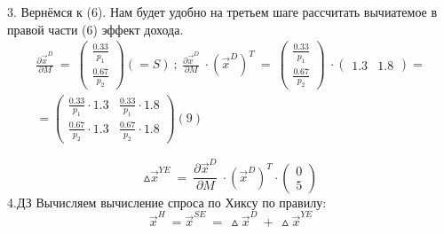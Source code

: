 \documentclass[12pt,a4paper]{article}
\begin{document}
	3. Вернёмся к (6). Нам будет удобно на третьем шаге рассчитать вычиатемое в правой части (6) эффект дохода.
\begin{gather*}
\frac{\partial \vec{x}^{D}}{\partial M} \ =\ \begin{pmatrix}
\frac{0.33}{p_{1}}\\
\frac{0.67}{p_{2}}
\end{pmatrix}( =S) \ ;\ \frac{\partial \vec{x}^{D}}{\partial M} \ \cdot (\vec{x}^{D})^{T} \ =\ \begin{pmatrix}
\frac{0.33}{p_{1}}\\
\frac{0.67}{p_{2}}
\end{pmatrix} \ \cdot \begin{pmatrix}
1.3 & 1.8
\end{pmatrix} =\\
=\begin{pmatrix}
\frac{0.33}{p_{1}} \cdot 1.3 & \frac{0.33}{p_{1}} \cdot 1.8\\
\frac{0.67}{p_{2}} \cdot 1.3 & \frac{0.67}{p_{2}} \cdot 1.8
\end{pmatrix}
(9)
\end{gather*}

\begin{equation*}
\vartriangle \vec{x}^{YE} \ =\ \frac{\partial \vec{x}^{D}}{\partial M} \ \cdot (\vec{x}^{D})^{T} \cdot \begin{pmatrix}
0\\
5
\end{pmatrix}
\end{equation*}
	4.$\displaystyle \boxed{\text{ДЗ}}$ Вычисляем вычисление спроса по Хиксу по правилу:
\begin{equation*}
\vec{x}^{H} \ =\vec{x}^{SE} \ =\ \vartriangle \vec{x}^{D} \ +\ \vartriangle \vec{x}^{YE}
\end{equation*}
\end{document}
